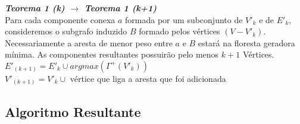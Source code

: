 \documentclass[12pt]{article}
\begin{document}
\textit{\textbf{Teorema 1 (k) $\rightarrow$ Teorema 1 (k+1)}}\\
Para cada componente conexa $a$ formada por um subconjunto de $V'_k$ e de $E'_k$, consideremos o subgrafo induzido $B$ formado pelos vértices $\left( V - V'_k \right)$. Necessariamente a aresta de menor peso entre $a$ e $B$ estará na floresta geradora mínima. As componentes resultantes possuirão
pelo menos $k + 1$ Vértices.\\

$E'_{(k+1)} = E'_k \cup {argmax(\Gamma^+(V'_k))}$\\
$V'_{(k+1)} = V'_k \cup$ vértice que liga a aresta que foi adicionada\\

\subsection{ Algoritmo Resultante }
\end{document}
